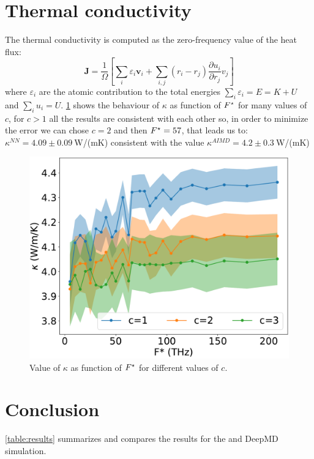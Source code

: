 \documentclass[%
 reprint,
 amsmath,amssymb,
 aps,
prb,
]{revtex4-2}
\begin{document}
\section{Thermal conductivity}
The thermal conductivity is computed as the zero-frequency value of the heat flux:
\begin{equation}
\mathbf{J} = \frac{1}{\Omega}\left[\sum_i \varepsilon_i \mathbf{v}_i + \sum_{i,j} (r_i-r_j) \frac{\partial u_i}{\partial r_j}v_j \right]
\end{equation}
where $\varepsilon_i$ are the atomic contribution to the total energies $\sum_i \varepsilon_i =E=K+U$ and $\sum_i u_i =U$. \cref{fig:kappa} shows the behaviour of $\kappa$ as function of $F^{\star}$ for many values of $c$, for $c>1$ all the results are consistent with each other so, in order to minimize the error we can chose $c=2$ and then  $F^{\star}=57$, that leads us to:
$\kappa^{NN} = 4.09 \pm 0.09~$W/(mK) consistent with the \ai value $\kappa^{AIMD} = 4.2 \pm 0.3~$W/(mK) 

\begin{figure}[tbh]
    \centering
    \includegraphics[width=\linewidth]{figs/kappa_corr_Fstar.pdf}
    \caption{Value of $\kappa$ as function  of $F^{\star}$ for different values of $c$. }
    \label{fig:kappa}
\end{figure}


\section{Conclusion}

\cref{table:results} summarizes and compares the results for the \ai and DeepMD simulation.
\end{document}
